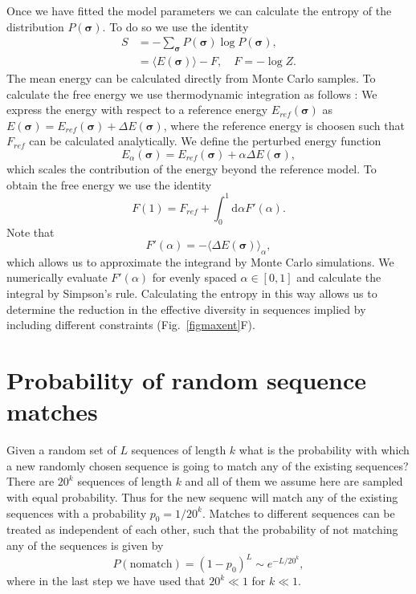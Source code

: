 \documentclass[superscriptaddress,twocolumn,pre]{revtex4}
\newcommand{\B}{\boldsymbol}
\newcommand{\ud}{\mathrm{d}}
\newcommand{\<}{\langle}
\renewcommand{\>}{\rangle}
\begin{document}
Once we have fitted the model parameters we can calculate the entropy of the distribution $P(\B \sigma)$. To do so we use the identity
\begin{align}
    S &= - \sum_{\B \sigma}  P(\B \sigma) \log P(\B \sigma),  \\
      &= \langle E(\B \sigma) \rangle - F, \quad F = - \log Z.
\end{align}
The mean energy can be calculated directly from Monte Carlo samples. To calculate the free energy we use thermodynamic integration as follows \cite{Marchi2019b}: We express the energy with respect to a reference energy $E_{ref}(\B \sigma)$ as $E(\B \sigma) = E_{ref}(\B \sigma) + \Delta E(\B\sigma)$, where the reference energy is choosen such that $F_{ref}$ can be calculated analytically. We define the perturbed energy function
\begin{equation}
    E_\alpha(\B \sigma) = E_{ref}(\B \sigma) + \alpha \Delta E(\B\sigma),
\end{equation}
which scales the contribution of the energy beyond the reference model.
To obtain the free energy we use the identity
\begin{equation}
    F(1) = F_{ref} + \int_0^1 \ud \alpha F'(\alpha).
\end{equation}
Note that
\begin{equation}
    F'(\alpha) = - \langle \Delta E(\B \sigma) \rangle_{\alpha},
\end{equation}
which allows us to approximate the integrand by Monte Carlo simulations. We numerically evaluate $F'(\alpha)$ for evenly spaced $\alpha \in [0, 1]$ and calculate the integral by Simpson's rule. Calculating the entropy in this way allows us to determine the reduction in the effective diversity in sequences implied by including different constraints (Fig.~\ref{figmaxent}F). 







\section{Probability of random sequence matches}
 \label{secsequencematching}
Given a random set of $L$ sequences of length $k$ what is the probability with which a new randomly chosen sequence is going to match any of the existing sequences?
There are $20^k$ sequences of length $k$ and all of them we assume here are sampled with equal probability. Thus for the new sequenc will match any of the existing sequences with a probability $p_0 = 1/20^k$. Matches to different sequences can be treated as independent of each other, such that the probability of not matching any of the sequences is given by
\begin{equation}
    P(\mathrm{no match}) = (1-p_0)^L \sim e^{-L / 20^k},
\end{equation}
where in the last step we have used that $20^k \ll 1$ for $k \ll 1$.
\end{document}
